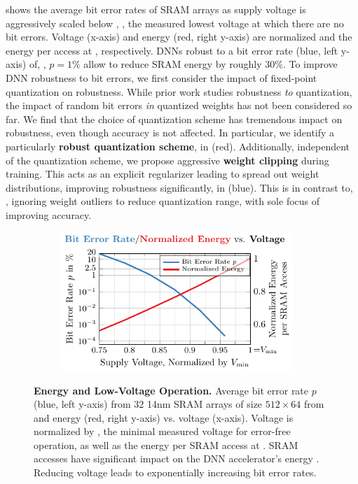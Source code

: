  shows the average bit error rates of SRAM arrays as supply voltage is aggressively scaled below \Vmin, \ie, the measured lowest voltage at which there are no bit errors. Voltage (x-axis) and energy ({\color{colorbrewer1}red}, right y-axis) are normalized \wrt \Vmin and the energy per access at \Vmin, respectively. DNNs robust to a bit error rate ({\color{colorbrewer2}blue}, left y-axis) of, \eg, $p = 1\%$ allow to reduce SRAM energy by roughly $30\%$.
To improve DNN robustness to bit errors, we first consider the impact of fixed-point quantization on robustness. While prior work \cite{MurthyARXIV2019,MerollaARXIV2016,SungARXIV2015} studies robustness \emph{to} quantization, the impact of random bit errors \emph{in} quantized weights has not been considered so far. We find that the choice of quantization scheme has tremendous impact on robustness, even though accuracy is not affected. In particular, we identify a particularly \textbf{robust quantization scheme}, \Quant in  ({\color{colorbrewer1}red}). 
Additionally, independent of the quantization scheme, we propose aggressive \textbf{weight clipping} during training. This acts as an explicit regularizer leading to spread out weight distributions, improving
robustness significantly,
\Clipping in  ({\color{colorbrewer2}blue}). This is in contrast to, \eg, \cite{ZhuangCVPR2018,SungARXIV2015} ignoring weight outliers to reduce quantization range, with sole focus of improving accuracy.

\begin{figure}[t]
    \centering
    \vspace*{-0.1cm}
    \hspace*{-0.4cm}
    \begin{subfigure}{0.475\textwidth}
    	\includegraphics[height=5.25cm]{c10_intro2.pdf}
    \end{subfigure}
    \vspace*{-8px}
    \caption{
    \textbf{Energy and Low-Voltage Operation.} Average bit error rate $p$ ({\color{colorbrewer2}blue}, left y-axis) from $32$ 14nm SRAM arrays of size $512{\times}64$ from \cite{ChandramoorthyHPCA2019} and energy ({\color{colorbrewer1}red}, right y-axis) vs. voltage (x-axis). Voltage is normalized by \Vmin, the minimal measured voltage for error-free operation, as well as the energy per SRAM access at \Vmin. SRAM accesses have significant impact on the DNN accelerator's energy \cite{ChenISCA2016}. Reducing voltage leads to exponentially increasing bit error rates.
    }
    \label{fig:introduction}
    \vspace*{-0.2cm}
\end{figure}

